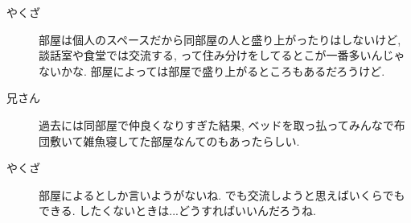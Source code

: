 \documentclass[10pt,b5jsbook,dvips,dvipdfmx,openany]{jsbook}
\theoremstyle{definition}
\begin{document}
\begin{multicols}{2}
\begin{description}
		\item[やくざ]部屋は個人のスペースだから同部屋の人と盛り上がったりはしないけど, 談話室や食堂では交流する, って住み分けをしてるとこが一番多いんじゃないかな. 部屋によっては部屋で盛り上がるところもあるだろうけど.
		\item[兄さん]過去には同部屋で仲良くなりすぎた結果, ベッドを取っ払ってみんなで布団敷いて雑魚寝してた部屋なんてのもあったらしい.
		\item[やくざ]部屋によるとしか言いようがないね. でも交流しようと思えばいくらでもできる. したくないときは...どうすればいいんだろうね.
		\end{description}



\end{multicols}
\end{document}
